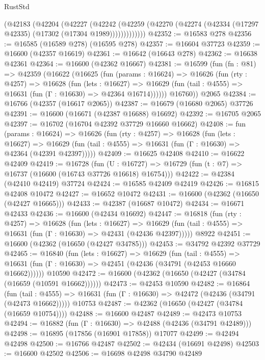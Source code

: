 \begin{lexlean}{RustStd}
\begin{coremodule}
{\begin{coremodule}
{{{{{{{{{{{{{{{{{{{{{{{{{{{{{{{{{{{{{{{{{{{{{{{{{{{{{{{          (@42183
            (@42204
              (@42227
                (@42242
                  (@42259 (@42270 (@42274 (@42334 (@17297 @42335) (@17302 (@17304 @1989)))))))))))))
@42352 := @16583 @278
@42356 := @16585 (@16589 @278) (@16595 @278)
@42357 := @16604 @37723
@42359 := @16600 (@42357 @16619)
@42361 := @16642 (@16643 @278)
@42362 := @16638 @42361
@42364 := @16600 (@42362 @16667)
@42381 := @16599
    (fun (fn : @81) =>
    @42359
      (@16622
        (@16625
          (fun (params : @16624) =>
          @16626
            (fun (rty : @4257) =>
            @16628
              (fun (lets : @16627) =>
              @16629 (fun (tail : @4555) => @16631 (fun (Γ : @16630) => @42364 @16714))))))
        @16760))
    @2065
@42384 := @16766 (@42357 (@16617 @2065))
@42387 := @16679 (@16680 @2065) @37726
@42391 := @16600 (@16671 (@42387 @16688) @16692)
@42392 := @16705 @2065
@42397 := @16702 (@16704 @42392 @37729 @16660 @16662)
@42408 := fun (params : @16624) =>
  @16626
    (fun (rty : @4257) =>
    @16628
      (fun (lets : @16627) =>
      @16629 (fun (tail : @4555) => @16631 (fun (Γ : @16630) => @42364 (@42391 @42397)))))
@42409 := @16625 @42408
@42410 := @16622 @42409
@42419 := @16728
    (fun (U : @16727) => @16729 (fun (t : @7) => @16737 (@16600 (@16743 @37726 @16618) @16754)))
@42422 := @42384 (@42410 @42419) @37724
@42424 := @16585 @42409 @42419
@42426 := @16815 @42408 @10472
@42427 := @16652 @10472
@42431 := @16600 (@42362 (@16650 (@42427 @16665)))
@42433 := @42387 (@16687 @10472)
@42434 := @16671 @42433
@42436 := @16600 (@42434 @16692)
@42447 := @16818
    (fun (rty : @4257) =>
    @16628
      (fun (lets : @16627) =>
      @16629 (fun (tail : @4555) => @16631 (fun (Γ : @16630) => @42431 (@42436 @42397)))))
    @8922
@42451 := @16600 (@42362 (@16650 (@42427 @34785)))
@42453 := @34792 @42392 @37729
@42465 := @16840
    (fun (lets : @16627) =>
    @16629
      (fun (tail : @4555) =>
      @16631 (fun (Γ : @16630) => @42451 (@42436 (@34791 (@42453 @16660 @16662))))))
    @10590
@42472 := @16600 (@42362 (@16650 (@42427 (@34784 (@16659 (@10591 @16662))))))
@42473 := @42453 @10590
@42482 := @16864
    (fun (tail : @4555) => @16631 (fun (Γ : @16630) => @42472 (@42436 (@34791 (@42473 @16662)))))
    @10753
@42487 := @42362 (@16650 (@42427 (@34784 (@16659 @10754))))
@42488 := @16600 @42487
@42489 := @42473 @10753
@42494 := @16882 (fun (Γ : @16630) => @42488 (@42436 (@34791 @42489)))
@42498 := @16895 (@17856 (@16901 @17858)) @17077
@42499 := @42494 @42498
@42500 := @16766 @42487
@42502 := @42434 (@16691 @42498)
@42503 := @16600 @42502
@42506 := @16698 @42498 @34790 @42489
}}}}}}}}}}}}}}}}}}}}}}}}}}}}}}}}}}}}}}}}}}}}}}}}}}}}}}}
\end{coremodule}}
\end{coremodule}
\end{lexlean}
